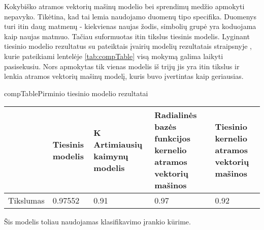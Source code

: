 
Kokybiško atramos vektorių mašinų modelio bei sprendimų medžio apmokyti nepavyko.
Tikėtina, kad tai lemia naudojamo duomenų tipo specifika. Duomenys turi itin daug
matmenų - kiekvienas naujas žodis, simbolių grupė yra koduojama kaip naujas matmuo.
Tačiau suformuotas itin tikslus tiesinis modelis. Lyginant tiesinio modelio rezultatus
su pateiktais įvairių modelių rezultatais straipsnyje \cite{comp}, kurie pateikiami
lentelėje \vref{tab:compTable} visą mokymą galima laikyti pasisekusiu. Nors apmokytas
tik vienas modelis iš trijų jis yra itin tikslus ir lenkia atramos vektorių mašinų
modelį, kuris buvo įvertintas kaip geriausias.

\begin{ktutable}{compTable}{Pirminio tiesinio modelio rezultatai}
    \begin{tabular}{|l|p{3cm}|p{3cm}|p{3cm}|p{3cm}|}
    \hline
                             & Tiesinis modelis  &  K Artimiausių kaimynų modelis  &  Radialinės bazės funkcijos kernelio atramos vektorių mašinos  &  Tiesinio kernelio atramos vektorių mašinos               \\ \hline
               Tikslumas     & 0.97552           & 0.91   & 0.97  &  0.92         \\ \hline
    \end{tabular}
\end{ktutable}

Šis modelis toliau naudojamas klasifikavimo įrankio kūrime.
